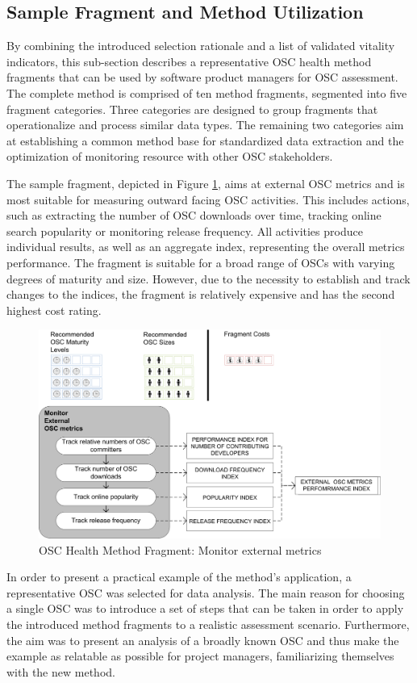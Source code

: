 \documentclass[final,5p,times,twocolumn]{elsarticle}
\begin{document}
\subsection{Sample Fragment and Method Utilization}
\label{sub_section_method_utilization}
By combining the introduced selection rationale and a list of validated vitality indicators, this sub-section describes a representative OSC health method fragments that can be used by software product managers for OSC assessment. The complete method is comprised of ten method fragments, segmented into five fragment categories. Three categories are  designed to group fragments that operationalize and process similar data types. The remaining two categories aim at establishing a common method base for standardized data extraction and the optimization of monitoring resource with other OSC stakeholders.

The sample fragment, depicted in Figure \ref{fig:OSC_method_fragment}, aims at external OSC metrics and is most suitable for measuring outward facing OSC activities. This includes actions, such as extracting the number of OSC downloads over time, tracking online search popularity or monitoring release frequency. All activities produce individual results, as well as an aggregate index, representing the overall metrics performance. The fragment is suitable for a broad range of OSCs with varying degrees of maturity and size. However, due to the necessity to establish and track changes to the indices, the fragment is relatively expensive and has the second highest cost rating.
\begin{figure}
\begin{center}
\includegraphics[scale=0.7]{figures/monitor_external_metrics.png}
\caption{OSC Health Method Fragment: Monitor external metrics}
\label{fig:OSC_method_fragment}
\end{center}
\end{figure}   
In order to present a practical example of the method’s application, a representative OSC was selected for data analysis. The main reason for choosing a single OSC was to introduce a set of steps that can be taken in order to apply the introduced method fragments to a realistic assessment scenario. Furthermore, the aim was to present an analysis of a broadly known OSC and thus make the example as relatable as possible for project managers, familiarizing themselves with the new method. 
\end{document}
